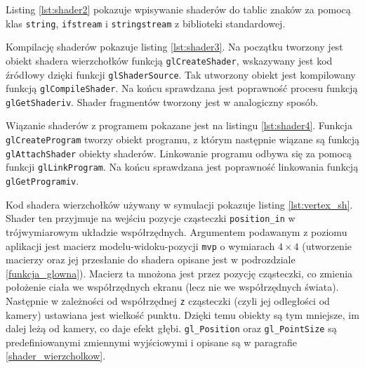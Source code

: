 \documentclass[12pt, twoside, openany]{report}
\begin{document}


Listing \ref{lst:shader2} pokazuje wpisywanie shaderów do tablic znaków za pomocą klas \texttt{string}, \texttt{ifstream} i \texttt{stringstream} z biblioteki standardowej.
\smallskip


Kompilację shaderów pokazuje listing \ref{lst:shader3}. Na początku tworzony jest obiekt shadera wierzchołków funkcją \texttt{glCreateShader}, wskazywany jest kod źródłowy dzięki funkcji \texttt{glShaderSource}. Tak utworzony obiekt jest kompilowany funkcją \texttt{glCompileShader}. Na końcu sprawdzana jest poprawność procesu funkcją \texttt{glGetShaderiv}. Shader fragmentów tworzony jest w analogiczny sposób.



Wiązanie shaderów z programem pokazane jest na listingu \ref{lst:shader4}. Funkcja\\\texttt{glCreateProgram} tworzy obiekt programu, z którym następnie wiązane są funkcją \texttt{glAttachShader} obiekty shaderów. Linkowanie programu odbywa się za pomocą funkcji \texttt{glLinkProgram}. Na końcu sprawdzana jest poprawność linkowania funkcją \texttt{glGetProgramiv}.



Kod shadera wierzchołków używany w symulacji pokazuje listing \ref{lst:vertex_sh}. Shader ten przyjmuje na wejściu pozycje cząsteczki \texttt{position\_in} w trójwymiarowym układzie współrzędnych. Argumentem podawanym z poziomu aplikacji jest macierz modelu-widoku-pozycji \texttt{mvp} o wymiarach $4\times 4$ (utworzenie macierzy oraz jej przesłanie do shadera opisane jest w podrozdziale \ref{funkcja_glowna}). Macierz ta mnożona jest przez pozycję cząsteczki, co zmienia położenie ciała we współrzędnych ekranu (lecz nie we współrzędnych świata). Następnie w zależności od współrzędnej \texttt z cząsteczki (czyli jej odległości od kamery) ustawiana jest wielkość punktu. Dzięki temu obiekty są tym mniejsze, im dalej leżą od kamery, co daje efekt głębi. \texttt{gl\_Position} oraz \texttt{gl\_PointSize} są predefiniowanymi zmiennymi wyjściowymi i opisane są w paragrafie \ref{shader_wierzcholkow}.
\medskip
\end{document}
